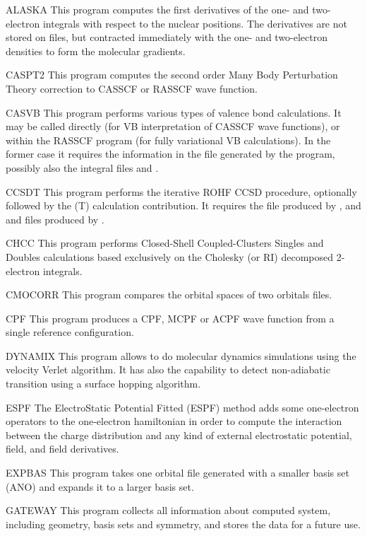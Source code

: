 \begin{programlist}
\item[ALASKA]
This program computes the first derivatives of the one-{} and
two-{}electron integrals with respect to the nuclear positions.
The derivatives are not stored on files, but contracted
immediately with the one-{} and two-{}electron densities to form the
molecular gradients.
\item[CASPT2]
This program computes the second order Many Body Perturbation Theory
correction to CASSCF or RASSCF wave function.
\item[CASVB]
This program performs various types of valence bond calculations.
It may be called directly (for VB interpretation of CASSCF wave functions),
or within the RASSCF program (for fully variational VB calculations).
In the former case it requires the information in the
 file generated by the  program, possibly also the
integral files  and .
\item[CCSDT]
This program performs the iterative ROHF CCSD procedure,
optionally followed by the (T) calculation contribution.
It requires the  file produced by
, and  and  files produced by .
\item[CHCC]
This program performs Closed-Shell Coupled-Clusters Singles and
Doubles calculations based exclusively on the Cholesky (or RI)
decomposed 2-electron integrals.
\item[CMOCORR]
This program compares the orbital spaces of two orbitals files.
\item[CPF]
This program produces a CPF, MCPF or ACPF wave function from a
single reference configuration.
\item[DYNAMIX]
 This program allows to do molecular dynamics
 simulations using the velocity Verlet algorithm. It has
 also the capability to detect non-adiabatic transition
 using a surface hopping algorithm.
\item[ESPF]
 The ElectroStatic Potential Fitted (ESPF) method adds some
 one-electron operators to the one-electron hamiltonian in
 order to compute the interaction between the charge
 distribution and any kind of external electrostatic
 potential, field, and field derivatives.
\item[EXPBAS]
This program takes one orbital file generated with a smaller basis set (ANO) and
expands it to a larger basis set.
\item[GATEWAY]
This program collects all information about computed system, including
geometry, basis sets and symmetry, and stores the data for a future use.


\end{programlist}
